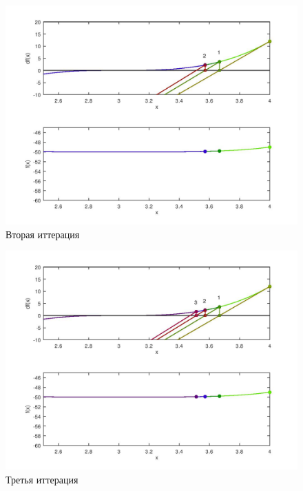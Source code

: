 \documentclass[a4paper,12pt]{article}
\begin{document}
    \begin{figure}[H]
        \centering
        \includegraphics[scale=0.4]{2secantitter.jpg}
        \caption{Вторая иттерация}
    \end{figure}
    \begin{figure}[H]
        \centering
        \includegraphics[scale=0.4]{3secantitter.jpg}
        \caption{Третья иттерация}
    \end{figure}
\end{document}

